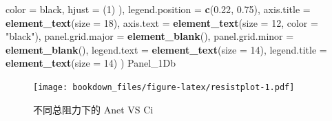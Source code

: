 \documentclass[
]{krantz}
\makeatletter
\newenvironment{Shaded}{\begin{snugshade}}{\end{snugshade}}
\newcommand{\DataTypeTok}[1]{\textcolor[rgb]{0.13,0.29,0.53}{#1}}
\newcommand{\DecValTok}[1]{\textcolor[rgb]{0.00,0.00,0.81}{#1}}
\newcommand{\FloatTok}[1]{\textcolor[rgb]{0.00,0.00,0.81}{#1}}
\newcommand{\KeywordTok}[1]{\textcolor[rgb]{0.13,0.29,0.53}{\textbf{#1}}}
\newcommand{\NormalTok}[1]{#1}
\newcommand{\StringTok}[1]{\textcolor[rgb]{0.31,0.60,0.02}{#1}}
\newenvironment{kframe}{%
\medskip{}
\setlength{\fboxsep}{.8em}
 \def\at@end@of@kframe{}%
 \ifinner\ifhmode%
  \def\at@end@of@kframe{\end{minipage}}%
  \begin{minipage}{\columnwidth}%
 \fi\fi%
 \def\FrameCommand##1{\hskip\@totalleftmargin \hskip-\fboxsep
 \colorbox{shadecolor}{##1}\hskip-\fboxsep
     \hskip-\linewidth \hskip-\@totalleftmargin \hskip\columnwidth}%
 \MakeFramed {\advance\hsize-\width
   \@totalleftmargin\z@ \linewidth\hsize
   \@setminipage}}%
 {\par\unskip\endMakeFramed%
 \at@end@of@kframe}
\renewenvironment{Shaded}{\begin{kframe}}{\end{kframe}}
\makeatother
\begin{document}
\begin{Shaded}
\begin{Highlighting}[]
        \DataTypeTok{color =} \StringTok{\textquotesingle{}black\textquotesingle{}}\NormalTok{,}
        \DataTypeTok{hjust =}\NormalTok{ (}\DecValTok{1}\NormalTok{)}
\NormalTok{      ),}
    \DataTypeTok{legend.position =} \KeywordTok{c}\NormalTok{(}\FloatTok{0.22}\NormalTok{, }\FloatTok{0.75}\NormalTok{),}
    \DataTypeTok{axis.title =} \KeywordTok{element\_text}\NormalTok{(}\DataTypeTok{size =} \DecValTok{18}\NormalTok{),}
    \DataTypeTok{axis.text =} \KeywordTok{element\_text}\NormalTok{(}\DataTypeTok{size =} \DecValTok{12}\NormalTok{, }\DataTypeTok{color =} \StringTok{"black"}\NormalTok{),}
    \DataTypeTok{panel.grid.major =} \KeywordTok{element\_blank}\NormalTok{(),}
    \DataTypeTok{panel.grid.minor =} \KeywordTok{element\_blank}\NormalTok{(),}
    \DataTypeTok{legend.text =} \KeywordTok{element\_text}\NormalTok{(}\DataTypeTok{size =} \DecValTok{14}\NormalTok{),}
    \DataTypeTok{legend.title =} \KeywordTok{element\_text}\NormalTok{(}\DataTypeTok{size =} \DecValTok{14}\NormalTok{)}
\NormalTok{  )}
\NormalTok{Panel\_1Db}
\end{Highlighting}
\end{Shaded}

\begin{figure}
\centering
\texttt{[image: bookdown\_files/figure-latex/resistplot-1.pdf]}
\caption{\label{fig:resistplot}不同总阻力下的 Anet VS Ci}
\end{figure}
\end{document}
